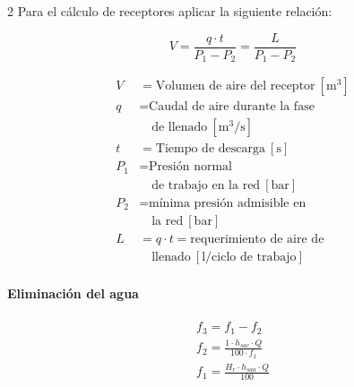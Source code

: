 \documentclass[11pt]{article}
\begin{document}
\begin{multicols*}{2}
    Para el cálculo de receptores aplicar la siguiente relación:

    \begin{equation}
        V = \frac{q \cdot t}{P_1 - P_2} = \frac{L}{P_1 - P_2}
    \end{equation}

    \begin{minipage}{\linewidth}
        \begin{align*}
            V &= \text{Volumen de aire del receptor} \ \mathrm{[m^3]} \\
            q &= \text{Caudal de aire durante la fase} \\
            &\quad \text{de llenado} \ \mathrm{[m^3/s]} \\
            t &= \text{Tiempo de descarga} \ \mathrm{[s]} \\
            P_1 &= \text{Presión normal} \\
            &\quad \text{de trabajo en la red} \ \mathrm{[bar]} \\
            P_2 &= \text{mínima presión admisible en} \\
            &\quad \text{la red} \ \mathrm{[bar]} \\
            L &= q \cdot t = \text{requerimiento de aire de} \\
            &\quad \text{llenado} \ \mathrm{[l / \text{ciclo de trabajo}]}
        \end{align*}
    \end{minipage}

    \paragraph*{Eliminación del agua}

    \begin{align*}
        f_3 = f_1 - f_2 \\
        f_2 = \frac{1 \cdot h_{sac} \cdot Q}{100 \cdot f_1} \\
        f_1 = \frac{H_r \cdot h_{saa} \cdot Q}{100}
    \end{align*}


\end{multicols*}
\end{document}
